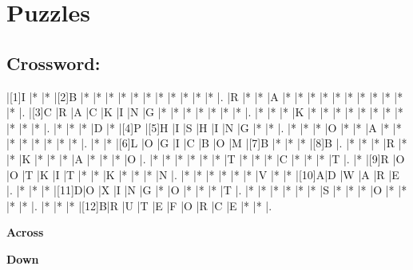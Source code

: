 \documentclass{article}
\begin{document}
\section*{Puzzles}

\subsection*{Crossword:}

\begin{Puzzle}{15}{14} %
|[1]I |*    |*    |[2]B |*    |*    |*    |*    |*    |*    |*    |*    |*    |*    |*    |.
|R    |*    |*    |A    |*    |*    |*    |*    |*    |*    |*    |*    |*    |*    |*    |.
|[3]C |R    |A    |C    |K    |I    |N    |G    |*    |*    |*    |*    |*    |*    |*    |.
|*    |*    |*    |K    |*    |*    |*    |*    |*    |*    |*    |*    |*    |*    |*    |.
|*    |*    |*    |D    |*    |[4]P |[5]H |I    |S    |H    |I    |N    |G    |*    |*    |.
|*    |*    |*    |O    |*    |*    |A    |*    |*    |*    |*    |*    |*    |*    |*    |.
|*    |*    |[6]L |O    |G    |I    |C    |B    |O    |M    |[7]B |*    |*    |*    |[8]B |.
|*    |*    |*    |R    |*    |*    |K    |*    |*    |*    |A    |*    |*    |*    |O    |.
|*    |*    |*    |*    |*    |*    |T    |*    |*    |*    |C    |*    |*    |*    |T    |.
|*    |[9]R |O    |O    |T    |K    |I    |T    |*    |*    |K    |*    |*    |*    |N    |.
|*    |*    |*    |*    |*    |*    |V    |*    |*    |[10]A|D    |W    |A    |R    |E    |.
|*    |*    |*    |[11]D|O    |X    |I    |N    |G    |*    |O    |*    |*    |*    |T    |.
|*    |*    |*    |*    |*    |*    |S    |*    |*    |*    |O    |*    |*    |*    |*    |.
|*    |*    |*    |[12]B|R    |U    |T    |E    |F    |O    |R    |C    |E    |*    |*    |.
\end{Puzzle}


\begin{PuzzleClues}{\textbf{Across}} %
\end{PuzzleClues} %
%
\begin{PuzzleClues}{\textbf{Down}}
\end{PuzzleClues}
\end{document}
